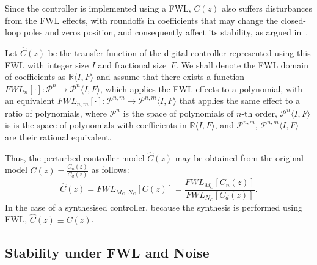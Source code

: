 \documentclass{sig-alternate-05-2015}
\begin{document}
Since the controller is implemented using a FWL, $C(z)$ also suffers
disturbances from the FWL effects, with roundoffs in coefficients that may
change the closed-loop poles and zeros position, and consequently affect its
stability, as argued in~\cite{Bessa16}.

Let $\hat{C}(z)$ be the transfer function of the digital controller
represented using this FWL with integer size $I$ and fractional size~$F$. 
We shall denote the FWL domain of coefficients as $\mathbb{R}\langle I,F
\rangle$
%
%
and assume that there exists a function
$\mathit{FWL}_n[\cdot]:\mathcal{P}^{n}\rightarrow \mathcal{P}^{n}\langle I,F \rangle$,
which applies the FWL effects to a polynomial, with an equivalent $\mathit{FWL}_{n,m}[\cdot]:\mathcal{P}^{n,m}\rightarrow \mathcal{P}^{n,m}\langle I,F \rangle$ that applies the same effect to a ratio of polynomials, where
$\mathcal{P}^{n}$ is the
space of polynomials of $n$-th order, $\mathcal{P}^{n}\langle I,F
\rangle$ is is the space of polynomials with coefficients in
$\mathbb{R}\langle I,F \rangle$, and $\mathcal{P}^{n,m}$,  $\mathcal{P}^{n,m}\langle I,F
\rangle$ are their rational equivalent.

Thus, the perturbed controller model $\hat{C}(z)$ may be obtained from the
original model $C(z)=\frac{C_{n}(z)}{C_{d}(z)}$ as follows:
%
\begin{equation}
\hat{C}(z)=\mathit{FWL}_{M_C,N_C}[C(z)]=\frac{\mathit{FWL}_{M_C}[C_n(z)]}{\mathit{FWL}_{N_C}[C_d(z)]}.
\end{equation}
%
In the case of a synthesised controller, because the synthesis is performed
using FWL, $\hat{C}(z) \equiv C(z)$.

%

\subsection{Stability under FWL and Noise}
\label{sec:stability}
\end{document}
